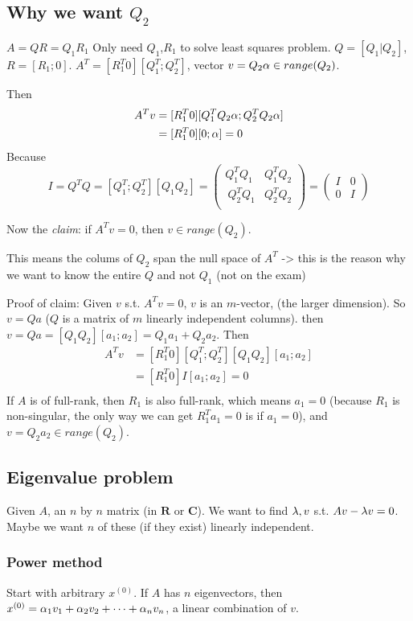\subsection{Why we want $Q_2$}
$A=QR=Q_1R_1$ Only need $Q_1$,$R_1$ to solve least squares
problem. $Q=[Q_1|Q_2]$, $R=[R_1; 0]$. $A^T=[R_1^T 0][Q_1^T; Q_2^T]$,
  vector $v=Q_2\alpha \in range(Q_2)$.

Then 
\begin{align*}
A^Tv &= [R_1^T 0][Q_1^TQ_2\alpha; Q_2^TQ_2\alpha]   \\
&=[R_1^T 0][0; \alpha] = 0\\
\end{align*}
Because $$I=Q^TQ = [Q_1^T; Q_2^T][Q_1 Q_2] =
\begin{pmatrix}
  Q_1^TQ_1 & Q_1^TQ_2\\\
  Q_2^TQ_1 & Q_2^TQ_2\\\
\end{pmatrix} =
\begin{pmatrix}
I&0\\0& I  
\end{pmatrix}
$$

Now the \emph{claim}: if $A^Tv = 0$, then $v\in range(Q_2)$. 

This means the
colums of $Q_2$ span the null space of $A^T$ -> this is the reason why
we want to know the entire $Q$ and not $Q_1$
(not on the exam)

Proof of claim: Given $v$ s.t. $A^Tv = 0$, $v$ is an $m$-vector, (the
larger dimension). So $v= Qa$ ($Q$ is a matrix of $m$ linearly
independent columns). then $v=Qa = [Q_1Q_2][a_1;a_2] = Q_1a_1 +
Q_2a_2$.
Then 
\begin{align*}
A^Tv &=[R_1^T 0][Q_1^T; Q_2^T][Q_1Q_2][a_1;a_2]\\  
&=[R_1^T 0]I[a_1;a_2] = 0\\  
\end{align*}
If $A$ is of full-rank, then $R_1$ is also full-rank, which means
$a_1=0$ (because $R_1$ is non-singular, the only way we can get
$R_1^Ta_1=0$ is if $a_1=0$), and $v=Q_2a_2\in range(Q_2)$.

\subsection{Eigenvalue problem}
Given $A$, an $n$ by $n$ matrix (in $ \mathbf{R}$ or $
\mathbf{C}$). We want to find $\lambda, v$ s.t. $Av - \lambda v = 0$. Maybe we
want $n$ of these (if they exist) linearly independent.

\subsubsection{Power method}
Start with arbitrary $x^{(0)}$. If $A$ has $n$ eigenvectors, then
$x^{(0)} = \alpha_1v_1 + \alpha_2v_2 + \cdots + \alpha_nv_n$, a linear
combination of $v$.

